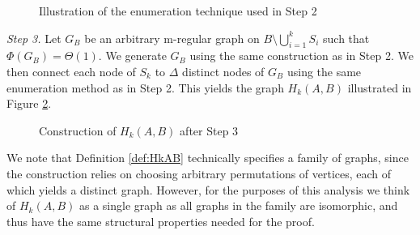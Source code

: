 \begin{definition}
    \begin{figure}[h]
        \centering
        
        \caption{Illustration of the enumeration technique used in Step 2}
        \label{fig:HkAB_2}
    \end{figure}


	\textit{Step 3.} Let $G_B$ be an arbitrary m-regular graph on $B \setminus \bigcup_{i=1}^k S_i$ such that $\Phi(G_B) = \Theta(1)$. 
	We generate $G_B$ using the same construction as in Step 2. We then connect each node of $S_k$ to $\Delta$ distinct nodes of $G_B$ using the same enumeration method as in Step 2. This yields the graph $H_k(A,B)$ illustrated in Figure \ref{fig:HkAB_3}.

    \begin{figure}[h]
        \centering
        
        \caption{Construction of $H_k(A,B)$ after Step 3}
        \label{fig:HkAB_3}
    \end{figure}


\end{definition}

We note that Definition \ref{def:HkAB} technically specifies a family of graphs, since the construction relies on choosing arbitrary permutations of vertices, each of which yields a distinct graph. However, for the purposes of this analysis we think of $H_k(A,B)$ as a single graph as all graphs in the family are isomorphic, and thus have the same structural properties needed for the proof. %


